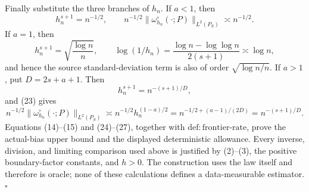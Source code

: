 Finally substitute the three branches of \(h_n\). If \(a<1\), then
\[
h_n^{s+1}=n^{-1/2},
\qquad n^{-1/2}\|\omega_{h_n}^{\circ}(\cdot;P)\|_{L^2(P_S)}\asymp n^{-1/2}.
\tag{24}
\]
If \(a=1\), then
\[
h_n^{s+1}=\sqrt{\frac{\log n}{n}},
\qquad
\log(1/h_n)=\frac{\log n-\log\log n}{2(s+1)}\asymp\log n,
\tag{25}
\]
and hence the source standard-deviation term is also of order
\(\sqrt{\log n/n}\). If \(a>1\), put \(D=2s+a+1\). Then
\[
h_n^{s+1}=n^{-(s+1)/D},
\tag{26}
\]
and (23) gives
\[
n^{-1/2}\|\omega_{h_n}^{\circ}(\cdot;P)\|_{L^2(P_S)}
\asymp n^{-1/2}h_n^{(1-a)/2}
=n^{-1/2+(a-1)/(2D)}
=n^{-(s+1)/D}.
\tag{27}
\]
Equations (14)--(15) and (24)--(27), together with
\(\mathrm{def:frontier\text{-}rate}\), prove the actual-bias upper bound and the displayed deterministic allowance. Every inverse, division, and limiting comparison used above is justified by (2)--(3), the positive boundary-factor constants, and \(h>0\). The construction uses the law itself and therefore is oracle; none of these calculations defines a data-measurable estimator. \(\square\)